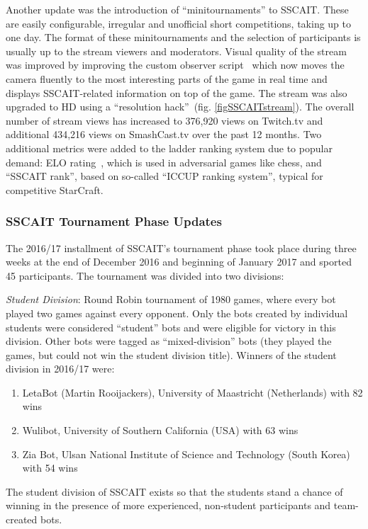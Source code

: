 Another update was the introduction of ``minitournaments'' to SSCAIT. These are easily configurable, irregular and unofficial short competitions, taking up to one day. The format of these minitournaments and the selection of participants is usually up to the stream viewers and moderators. Visual quality of the stream was improved by improving the custom observer script~\cite{mattsson2015automatic} which now moves the camera fluently to the most interesting parts of the game in real time and displays SSCAIT-related information on top of the game. The stream was also upgraded to HD using a ``resolution hack''~(fig. \ref{figSSCAITstream}). 
The overall number of stream views has increased to 376,920 views on Twitch.tv and additional 434,216 views on SmashCast.tv over the past 12 months. Two additional metrics were added to the ladder ranking system due to popular demand: ELO rating~\cite{elo1978rating}, which is used in adversarial games like chess, and ``SSCAIT rank'', based on so-called ``ICCUP ranking system'', typical for competitive StarCraft.

\subsubsection{SSCAIT Tournament Phase Updates}

The 2016/17 installment of SSCAIT's tournament phase took place during three weeks at the end of December 2016 and beginning of January 2017 and sported 45 participants. The tournament was divided into two divisions:

\emph{Student Division}: Round Robin tournament of 1980 games, where every bot played two games against every opponent. Only the bots created by individual students were considered ``student'' bots and were eligible for victory in this division. Other bots were tagged as ``mixed-division'' bots (they played the games, but could not win the student division title). Winners of the student division in 2016/17 were:
  \begin{enumerate}
	\item LetaBot (Martin Rooijackers), University of Maastricht (Netherlands) with 82 wins
	\item Wulibot, University of Southern California (USA) with 63 wins
	\item Zia Bot, Ulsan National Institute of Science and Technology (South Korea) with 54 wins
  \end{enumerate}
The student division of SSCAIT exists so that the students stand a chance of winning in the presence of more experienced, non-student participants and team-created bots.

